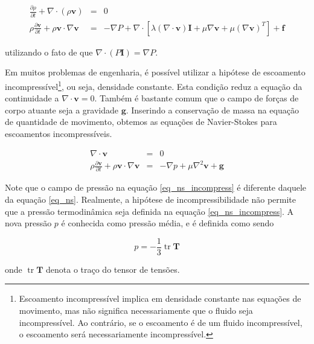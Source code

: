 \documentclass[a4paper,portuguese,10pt]{article}
\renewcommand{\div}{\nabla\cdot}
\newcommand{\grad}{\nabla}
\renewcommand{\D}{\partial}
\renewcommand{\vec}{\mathbf}
\newcommand{\tr}{\operatorname{tr}}
\begin{document}
\begin{subequations}
\begin{eqnarray}
  \frac{\D\rho}{\D t} + \div(\rho\vec{v}) &=& 0\\
  \rho\frac{\D\vec{v}}{\D t}+\rho\vec{v}\cdot\grad\vec{v} &=& -\grad P + \div[\lambda(\div\vec{v})\vec{I} + \mu\grad\vec{v}+\mu(\grad\vec{v})^T] + \vec{f}
\end{eqnarray}
\label{eq_ns}
\end{subequations}

utilizando o fato de que $\div(P\vec{I}) = \grad P$.

Em muitos problemas de engenharia, é possível utilizar a hipótese de escoamento incompressível\footnote{Escoamento incompressível implica em densidade constante nas equações de movimento, mas não significa necessariamente que o fluido seja incompressível. Ao contrário, se o escoamento é de um fluido incompressível, o escoamento será necessariamente incompressível.}, ou seja, densidade constante. Esta condição reduz a equação da continuidade a $\div\vec{v} = 0$. Também é bastante comum que o campo de forças de corpo atuante seja a gravidade $\vec{g}$. Inserindo a conservação de massa na equação de quantidade de movimento, obtemos as equações de Navier-Stokes para escoamentos incompressíveis.

\begin{subequations}
\begin{eqnarray}
  \div\vec{v} &=& 0\\
  \rho\frac{\D\vec{v}}{\D t}+\rho\vec{v}\cdot\grad\vec{v} &=& -\grad p + \mu\grad^2\vec{v} + \vec{g}
\end{eqnarray}
\label{eq_ns_incompress}
\end{subequations}

Note que o campo de pressão na equação \ref{eq_ns_incompress} é diferente daquele da equação \ref{eq_ns}. Realmente, a hipótese de incompressibilidade não permite que a pressão termodinâmica seja definida na equação \ref{eq_ns_incompress}. A nova pressão $p$ é conhecida como pressão média, e é definida como sendo

\begin{equation}
  p = -\frac{1}{3}\tr\vec{T}
\end{equation}

onde $\tr\vec{T}$ denota o traço do tensor de tensões.

\singlespacing

\nocite{GAMA05}



\end{document}
